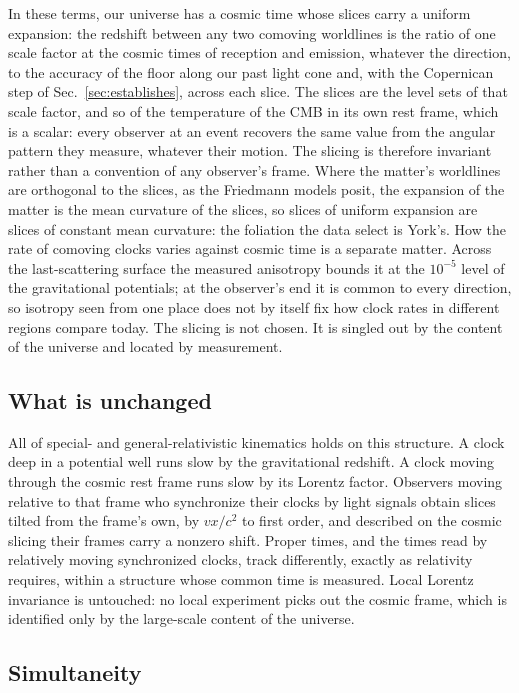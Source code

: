 \documentclass[aps,prd,reprint,amsmath,amssymb,superscriptaddress]{revtex4-2}
\begin{document}
In these terms, our universe has a cosmic time whose slices carry a uniform expansion: the redshift between any two comoving worldlines is the ratio of one scale factor at the cosmic times of reception and emission, whatever the direction, to the accuracy of the floor along our past light cone and, with the Copernican step of Sec.~\ref{sec:establishes}, across each slice. The slices are the level sets of that scale factor, and so of the temperature of the CMB in its own rest frame, which is a scalar: every observer at an event recovers the same value from the angular pattern they measure, whatever their motion. The slicing is therefore invariant rather than a convention of any observer's frame. Where the matter's worldlines are orthogonal to the slices, as the Friedmann models posit, the expansion of the matter is the mean curvature of the slices, so slices of uniform expansion are slices of constant mean curvature: the foliation the data select is York's. How the rate of comoving clocks varies against cosmic time is a separate matter. Across the last-scattering surface the measured anisotropy bounds it at the $10^{-5}$ level of the gravitational potentials; at the observer's end it is common to every direction, so isotropy seen from one place does not by itself fix how clock rates in different regions compare today. The slicing is not chosen. It is singled out by the content of the universe and located by measurement.

\subsection{What is unchanged}

All of special- and general-relativistic kinematics holds on this structure. A clock deep in a potential well runs slow by the gravitational redshift. A clock moving through the cosmic rest frame runs slow by its Lorentz factor. Observers moving relative to that frame who synchronize their clocks by light signals obtain slices tilted from the frame's own, by $vx/c^{2}$ to first order, and described on the cosmic slicing their frames carry a nonzero shift. Proper times, and the times read by relatively moving synchronized clocks, track differently, exactly as relativity requires, within a structure whose common time is measured. Local Lorentz invariance is untouched: no local experiment picks out the cosmic frame, which is identified only by the large-scale content of the universe.

\subsection{Simultaneity}
\end{document}
